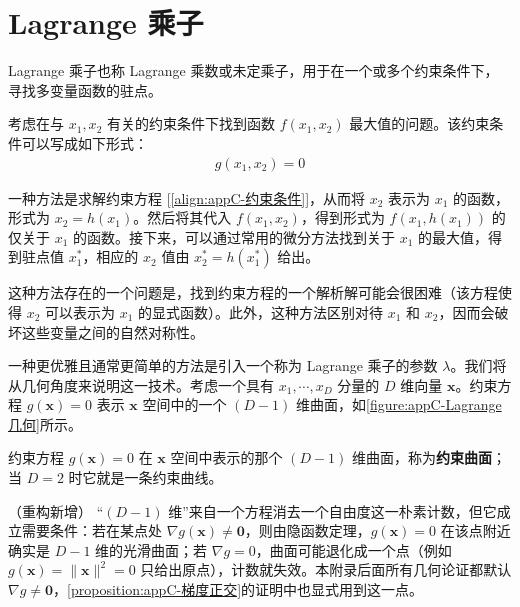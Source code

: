 \documentclass[../main.tex]{subfiles}
\begin{document}

\chapter{Lagrange 乘子}\label{chapter:appC-Lagrange乘子}

Lagrange 乘子也称 Lagrange 乘数或未定乘子，用于在一个或多个约束条件下，寻找多变量函数的驻点。

考虑在与 $x_1,x_2$ 有关的约束条件下找到函数 $f(x_1,x_2)$ 最大值的问题。该约束条件可以写成如下形式：
\begin{align}
  g(x_1,x_2)=0
  \label{align:appC-约束条件}
\end{align}

一种方法是求解约束方程 [\eqref{align:appC-约束条件}]，从而将 $x_2$ 表示为 $x_1$ 的函数，形式为 $x_2=h(x_1)$。然后将其代入 $f(x_1,x_2)$，得到形式为 $f(x_1,h(x_1))$ 的仅关于 $x_1$ 的函数。接下来，可以通过常用的微分方法找到关于 $x_1$ 的最大值，得到驻点值 $x_1^{*}$，相应的 $x_2$ 值由 $x_2^{*}=h(x_1^{*})$ 给出。

这种方法存在的一个问题是，找到约束方程的一个解析解可能会很困难（该方程使得 $x_2$ 可以表示为 $x_1$ 的显式函数）。此外，这种方法区别对待 $x_1$ 和 $x_2$，因而会破坏这些变量之间的自然对称性。

一种更优雅且通常更简单的方法是引入一个称为 Lagrange 乘子的参数 $\lambda$。我们将从几何角度来说明这一技术。考虑一个具有 $x_1,\cdots,x_D$ 分量的 $D$ 维向量 $\bm{x}$。约束方程 $g(\bm{x})=0$ 表示 $\bm{x}$ 空间中的一个 $(D-1)$ 维曲面，如\cref{figure:appC-Lagrange几何}所示。

\begin{definition}[约束曲面]\label{definition:appC-约束曲面}
约束方程 $g(\bm{x})=0$ 在 $\bm{x}$ 空间中表示的那个 $(D-1)$ 维曲面，称为\textbf{约束曲面}；当 $D=2$ 时它就是一条约束曲线。
\end{definition}

\begin{remark}（重构新增）
“$(D-1)$ 维”来自一个方程消去一个自由度这一朴素计数，但它成立需要条件：若在某点处 $\nabla g(\bm{x})\neq\bm{0}$，则由隐函数定理，$g(\bm{x})=0$ 在该点附近确实是 $D-1$ 维的光滑曲面；若 $\nabla g=0$，曲面可能退化成一个点（例如 $g(\bm{x})=\|\bm{x}\|^{2}=0$ 只给出原点），计数就失效。本附录后面所有几何论证都默认 $\nabla g\neq\bm{0}$，\cref{proposition:appC-梯度正交}的证明中也显式用到这一点。
\end{remark}
\end{document}

